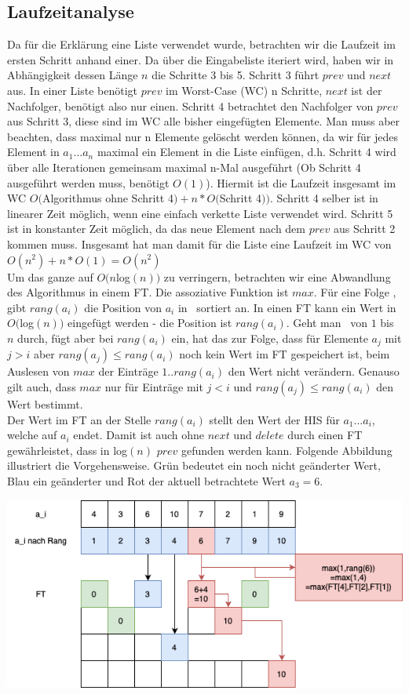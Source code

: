 \subsection{Laufzeitanalyse}
Da für die Erklärung eine Liste verwendet wurde, betrachten wir die Laufzeit im ersten Schritt anhand einer. Da über die Eingabeliste iteriert wird, haben wir in Abhängigkeit dessen Länge $n$ die Schritte 3 bis 5. Schritt 3 führt $prev$ und $next$ aus. In einer Liste benötigt $prev$ im Worst-Case (WC) n Schritte, $next$ ist der Nachfolger, benötigt also nur einen. Schritt 4 betrachtet den Nachfolger von $prev$ aus Schritt 3, diese sind im WC alle bisher eingefügten Elemente. Man muss aber beachten, dass maximal nur n Elemente gelöscht werden können, da wir für jedes Element in $a_1 \dots a_n$ maximal ein Element in die Liste einfügen, d.h. Schritt 4 wird über alle Iterationen gemeinsam maximal n-Mal ausgeführt (Ob Schritt 4 ausgeführt werden muss, benötigt $O(1)$). Hiermit ist die Laufzeit insgesamt im WC $O($Algorithmus ohne Schritt 4$)+n*O($Schritt 4$))$.  Schritt 4 selber ist in linearer Zeit möglich, wenn eine einfach verkette Liste verwendet wird. Schritt 5 ist in konstanter Zeit möglich, da das neue Element nach dem $prev$ aus Schritt 2 kommen muss.
Insgesamt hat man damit für die Liste eine Laufzeit im WC von $O(n^2)+n*O(1)=O(n^2)$\\
Um das ganze auf $O(n$log$(n))$ zu verringern, betrachten wir eine Abwandlung des Algorithmus in einem FT. Die assoziative Funktion ist $max$. Für eine Folge \an, gibt $rang(a_i)$ die Position von $a_i$ in \an ~sortiert an. In einen FT kann ein Wert in $O($log$(n))$ eingefügt werden - die Position ist $rang(a_i)$. Geht man \an ~von $1$ bis $n$ durch, fügt aber bei $rang(a_i)$ ein, hat das zur Folge, dass für Elemente $a_j$ mit $j>i$ aber $rang(a_j)\leq rang(a_i)$ noch kein Wert im FT gespeichert ist, beim Auslesen von $max$ der Einträge $1..rang(a_i)$ den Wert nicht verändern. Genauso gilt auch, dass $max$ nur für Einträge mit $j<i$ und $rang(a_j)\leq rang(a_i)$ den Wert bestimmt. \\
Der Wert im FT an der Stelle $rang(a_i)$ stellt den Wert der HIS  für $a_1 \dots a_i$, welche auf $a_i$ endet. Damit ist auch ohne $next$ und $delete$ durch einen FT gewährleistet, dass in log$(n)$ $prev$ gefunden werden kann. Folgende Abbildung illustriert die Vorgehensweise. Grün bedeutet ein noch nicht geänderter Wert, Blau ein geänderter und Rot der aktuell betrachtete Wert $a_3=6$.\\
\begin{center}
\includegraphics[scale=0.7]{./Pictures/FTexample.png}
\end{center}

